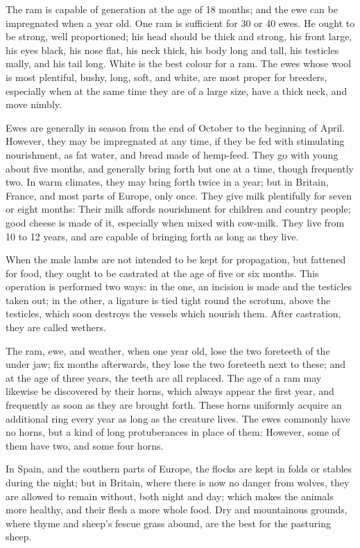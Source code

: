 \documentclass{article}
\begin{document}
The ram is capable of generation at the age of 18 months; and the ewe can be impregnated when a year old. One ram is sufficient for 30 or 40 ewes. He ought to be strong, well proportioned; his head should be thick and strong, his front large, his eyes black, his nose flat, his neck thick, his body long and tall, his testicles mally, and his tail long. White is the best colour for a ram. The ewes whose wool is most plentiful, bushy, long, soft, and white, are most proper for breeders, especially when at the same time they are of a large size, have a thick neck, and move nimbly.

Ewes are generally in season from the end of October to the beginning of April. However, they may be impregnated at any time, if they be fed with stimulating nourishment, as fat water, and bread made of hemp-feed. They go with young about five months, and generally bring forth but one at a time, though frequently two. In warm climates, they may bring forth twice in a year; but in Britain, France, and most parts of Europe, only once. They give milk plentifully for seven or eight months: Their milk affords nourishment for children and country people; good cheese is made of it, especially when mixed with cow-milk. They live from 10 to 12 years, and are capable of bringing forth as long as they live.

When the male lambs are not intended to be kept for propagation, but fattened for food, they ought to be castrated at the age of five or six months. This operation is performed two ways: in the one, an incision is made and the testicles taken out; in the other, a ligature is tied tight round the scrotum, above the testicles, which soon destroys the vessels which nourish them. After castration, they are called wethers.

The ram, ewe, and weather, when one year old, lose the two foreteeth of the under jaw; fix months afterwards, they lose the two foreteeth next to these; and at the age of three years, the teeth are all replaced. The age of a ram may likewise be discovered by their horns, which always appear the first year, and frequently as soon as they are brought forth. These horns uniformly acquire an additional ring every year as long as the creature lives. The ewes commonly have no horns, but a kind of long protuberances in place of them: However, some of them have two, and some four horns.

In Spain, and the southern parts of Europe, the flocks are kept in folds or stables during the night; but in Britain, where there is now no danger from wolves, they are allowed to remain without, both night and day; which makes the animals more healthy, and their flesh a more whole food. Dry and mountainous grounds, where thyme and sheep's fescue grass abound, are the best for the pasturing sheep.
\end{document}
